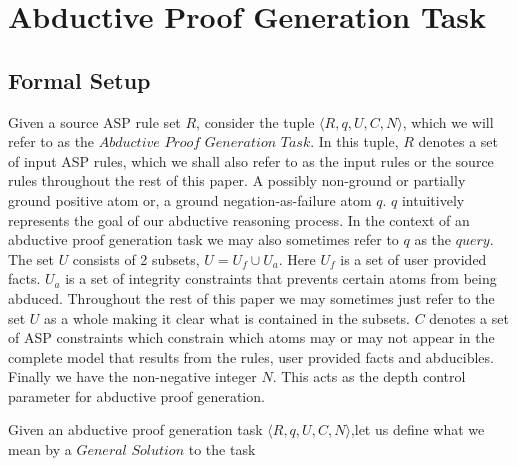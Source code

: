 \section{Abductive Proof Generation Task}\label{sec:abductive_proof}

\subsection{Formal Setup}\label{formalsetup}


\begin{definition}\label{def:abductive_proof_generation_task}

Given a source ASP rule set $R$, consider the tuple $\langle R,q,U,C,N \rangle$, which we will refer to as the $\textit{Abductive Proof Generation Task}$. In this tuple,  $R$ denotes a set of input ASP rules, which we shall also refer to as the input rules or the source rules throughout the rest of this paper. A possibly non-ground or partially ground positive atom or, a ground negation-as-failure atom $q$. $q$ intuitively represents the goal of our abductive reasoning process. In the context of an abductive proof generation task we may also sometimes refer to $q$ as the $query$. 
The set $U$ consists of 2 subsets, $U = U_{f} \cup U_{a}$. Here $U_{f}$ is a set of user provided facts. $U_{a}$ is a set of integrity constraints that prevents certain atoms from being abduced. Throughout the rest of this paper we may sometimes just refer to the set $U$ as a whole making it clear what is contained in the subsets. $C$ denotes a set of ASP constraints which constrain which atoms may or may not appear in the complete model that results from the rules, user provided facts and abducibles. Finally we have the non-negative integer $N$. This acts as the depth control parameter for abductive proof generation. 
 \end{definition}
Given an abductive proof generation task $\langle R,q,U,C,N \rangle$,let us define what we mean by a $\textit{General Solution}$ to the task

